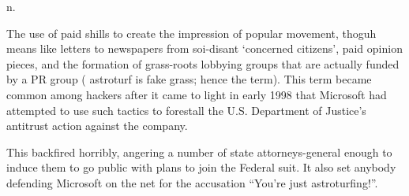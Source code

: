  n.

The use of paid shills to create the impression of popular movement, thoguh
means like letters to newspapers from soi-disant `concerned citizens', paid
opinion pieces, and the formation of grass-roots lobbying groups that are
actually funded by a PR group ( astroturf is fake grass; hence the term). This
term became common among hackers after it came to light in early 1998 that
Microsoft had attempted to use such tactics to forestall the U.S. Department of
Justice's antitrust action against the company.

This backfired horribly, angering a number of state attorneys-general enough to
induce them to go public with plans to join the Federal suit. It also set
anybody defending Microsoft on the net for the accusation ``You're just
astroturfing!''.

